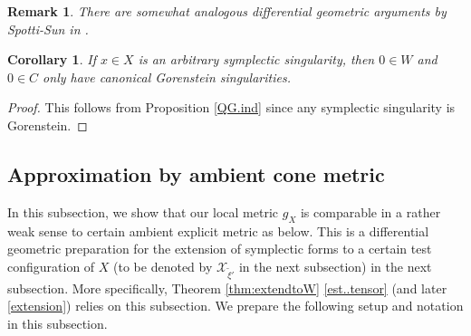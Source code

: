 \documentclass[12pt,a4paper]{amsart}
\newtheorem{Cor}[Thm]{Corollary}
\newtheorem{Rem}[Thm]{Remark}
\theoremstyle{remark}
\theoremstyle{definition}
\def\C{\mathbb{C}}
\begin{document}
 \begin{Rem}
There are somewhat analogous differential geometric arguments by Spotti-Sun 
in \cite[\S 3]{SS}. 
\end{Rem}

 \begin{Cor}
If $x\in X$ is an arbitrary symplectic singularity, then 
$0\in W$ and $0\in C$ only have canonical Gorenstein singularities.  
 \end{Cor}

 \begin{proof}
This follows from Proposition \ref{QG.ind} 
since any symplectic singularity is Gorenstein. 
 \end{proof}

\subsection{Approximation by ambient cone metric}\label{subsec:ambmet}

In this subsection, we show that our local metric 
$g_X$ is comparable in a rather weak sense to certain ambient explicit 
metric as below. 
This is a differential geometric preparation for the 
extension of symplectic forms to a certain test configuration of $X$ 
(to be denoted by $\mathcal{X}_{\tilde{\xi}'}$ in the 
next subsection) in the next subsection. 
More specifically, Theorem \ref{thm:extendtoW} 
\eqref{est..tensor} (and later \eqref{extension}) 
relies on this subsection. 
We prepare the following setup and notation 
in this subsection. 
\end{document}
